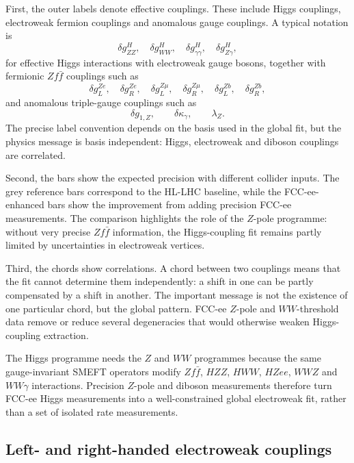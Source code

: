 \documentclass[11pt,a4paper]{report}
\begin{document}
First, the outer labels denote effective couplings.  These include Higgs
couplings, electroweak fermion couplings and anomalous gauge couplings.  A
typical notation is
\[
\delta g^H_{ZZ},\quad
\delta g^H_{WW},\quad
\delta g^H_{\gamma\gamma},\quad
\delta g^H_{Z\gamma},
\]
for effective Higgs interactions with electroweak gauge bosons, together with
fermionic \(Zf\bar f\) couplings such as
\[
\delta g^{Ze}_{L},\quad
\delta g^{Ze}_{R},\quad
\delta g^{Z\mu}_{L},\quad
\delta g^{Z\mu}_{R},\quad
\delta g^{Zb}_{L},\quad
\delta g^{Zb}_{R},
\]
and anomalous triple-gauge couplings such as
\[
\delta g_{1,Z},\qquad
\delta\kappa_\gamma,\qquad
\lambda_Z .
\]
The precise label convention depends on the basis used in the global fit, but
the physics message is basis independent: Higgs, electroweak and diboson
couplings are correlated.

Second, the bars show the expected precision with different collider inputs.
The grey reference bars correspond to the HL-LHC baseline, while the
FCC-ee-enhanced bars show the improvement from adding precision FCC-ee
measurements.  The comparison highlights the role of the \(Z\)-pole programme:
without very precise \(Zf\bar f\) information, the Higgs-coupling fit remains
partly limited by uncertainties in electroweak vertices.

Third, the chords show correlations.  A chord between two couplings means that
the fit cannot determine them independently: a shift in one can be partly
compensated by a shift in another.  The important message is not the existence
of one particular chord, but the global pattern.  FCC-ee \(Z\)-pole and
\(WW\)-threshold data remove or reduce several degeneracies that would
otherwise weaken Higgs-coupling extraction.



\begin{keymessagebox}
The Higgs programme needs the \(Z\) and \(WW\) programmes because the same
gauge-invariant SMEFT operators modify \(Zf\bar f\), \(HZZ\), \(HWW\),
\(HZee\), \(WWZ\) and \(WW\gamma\) interactions.  Precision \(Z\)-pole and
diboson measurements therefore turn FCC-ee Higgs measurements into a
well-constrained global electroweak fit, rather than a set of isolated rate
measurements.
\end{keymessagebox}



\subsection{Left- and right-handed electroweak couplings}
\label{subsec:left-right-ew-couplings-global}
\end{document}
